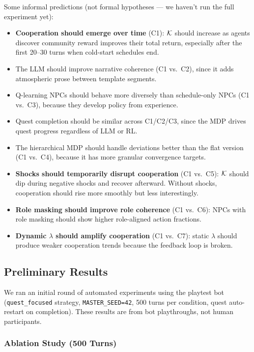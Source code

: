 Some informal predictions (not formal hypotheses --- we haven't run the full experiment yet):
\begin{itemize}
    \item \textbf{Cooperation should emerge over time} (C1): $\mathcal{K}$ should increase as agents discover community reward improves their total return, especially after the first 20--30 turns when cold-start schedules end.
    \item The LLM should improve narrative coherence (C1 vs.\ C2), since it adds atmospheric prose between template segments.
    \item Q-learning NPCs should behave more diversely than schedule-only NPCs (C1 vs.\ C3), because they develop policy from experience.
    \item Quest completion should be similar across C1/C2/C3, since the MDP drives quest progress regardless of LLM or RL.
    \item The hierarchical MDP should handle deviations better than the flat version (C1 vs.\ C4), because it has more granular convergence targets.
    \item \textbf{Shocks should temporarily disrupt cooperation} (C1 vs.\ C5): $\mathcal{K}$ should dip during negative shocks and recover afterward. Without shocks, cooperation should rise more smoothly but less interestingly.
    \item \textbf{Role masking should improve role coherence} (C1 vs.\ C6): NPCs with role masking should show higher role-aligned action fractions.
    \item \textbf{Dynamic $\lambda$ should amplify cooperation} (C1 vs.\ C7): static $\lambda$ should produce weaker cooperation trends because the feedback loop is broken.
\end{itemize}

\subsection{Preliminary Results}
\label{sec:preliminary_results}

We ran an initial round of automated experiments using the playtest bot (\texttt{quest\_focused} strategy, \texttt{MASTER\_SEED=42}, 500 turns per condition, quest auto-restart on completion). These results are from bot playthroughs, not human participants.

\subsubsection{Ablation Study (500 Turns)}

